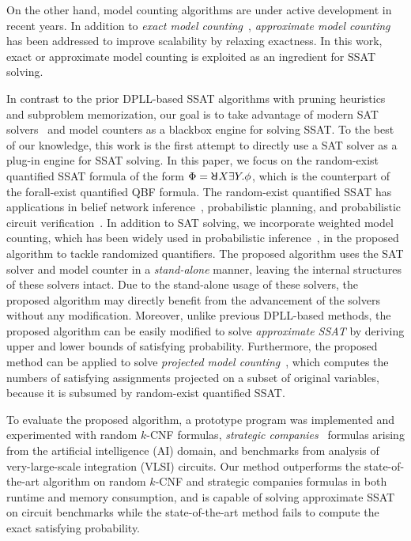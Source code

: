 On the other hand, model counting algorithms are under active development in recent years.
In addition to \textit{exact model counting}~\cite{Sang2004,Sang2005ModelCounting},
\textit{approximate model counting}~\cite{Gomes2006,Gomes2007,Chakraborty2016} has been addressed to improve scalability by relaxing exactness.
In this work, exact or approximate model counting is exploited as an ingredient for SSAT solving.

In contrast to the prior DPLL-based SSAT algorithms with pruning heuristics and subproblem memorization, our goal is to take advantage of modern SAT solvers~\cite{Een2003Solver,Een2003Incremental} and model counters as a blackbox engine for solving SSAT.
To the best of our knowledge, this work is the first attempt to directly use a SAT solver as a plug-in engine for SSAT solving.
In this paper, we focus on the random-exist quantified SSAT formula of the form $\Phi=\random{} X \exists Y.\phi$, which is the counterpart of the forall-exist quantified QBF formula.
The random-exist quantified SSAT has applications in belief network inference~\cite{Cooper1990,Bacchus2003}, probabilistic planning, and probabilistic circuit verification~\cite{LeeTC18ProbDesign}.
In addition to SAT solving, we incorporate weighted model counting, which has been widely used in probabilistic inference~\cite{Sang2005BayesianInference,Chavira2008}, in the proposed algorithm to tackle randomized quantifiers.
The proposed algorithm uses the SAT solver and model counter in a \textit{stand-alone} manner, leaving the internal structures of these solvers intact.
Due to the stand-alone usage of these solvers, the proposed algorithm may directly benefit from the advancement of the solvers without any modification.
Moreover, unlike previous DPLL-based methods, the proposed algorithm can be easily modified to solve \textit{approximate SSAT} by deriving upper and lower bounds of satisfying probability.
Furthermore, the proposed method can be applied to solve \textit{projected model counting}~\cite{Aziz2015}, which computes the numbers of satisfying assignments projected on a subset of original variables, because it is subsumed by random-exist quantified SSAT.

To evaluate the proposed algorithm, a prototype program was implemented and experimented with random $k$-CNF formulas, \textit{strategic companies}~\cite{Cadoli1997} formulas arising from the artificial intelligence (AI) domain, and benchmarks from analysis of very-large-scale integration (VLSI) circuits.
Our method outperforms the state-of-the-art algorithm on random $k$-CNF and strategic companies formulas in both runtime and memory consumption, and is capable of solving approximate SSAT on circuit benchmarks while the state-of-the-art method fails to compute the exact satisfying probability.

